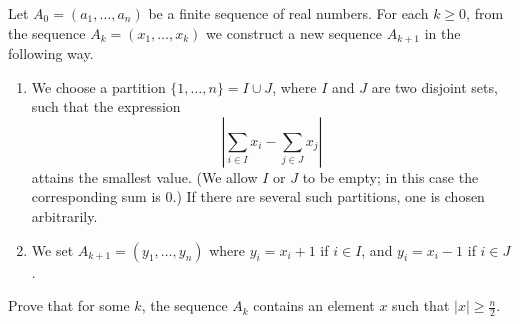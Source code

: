 Let $ A_0 = (a_1,\dots,a_n)$ be a finite sequence of real numbers. For each $ k\geq 0$,  from the sequence $ A_k = (x_1,\dots,x_k)$ we construct a new sequence $ A_{k + 1}$ in the following way.

\begin{enumerate}[label = (\roman*)]
	\item We choose a partition $ \{1,\dots,n\} = I\cup J$,  where $ I$ and $ J$ are two disjoint sets, such that the expression\[ \left|\sum_{i\in I}x_i - \sum_{j\in J}x_j\right|
\]
attains the smallest value. (We allow $ I$ or $ J$ to be empty; in this case the corresponding sum is 0.) If there are several such partitions, one is chosen arbitrarily.

	\item We set $ A_{k + 1} = (y_1,\dots,y_n)$ where $ y_i = x_i + 1$ if $ i\in I$,  and $ y_i = x_i - 1$ if $ i\in J$.
\end{enumerate}

Prove that for some $ k$,  the sequence $ A_k$ contains an element $ x$ such that $ |x|\geq\frac n2$.
